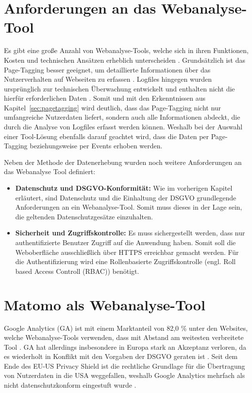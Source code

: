 \section{Anforderungen an das Webanalyse-Tool}
\label{sec:anforderungenWebanalyseTool}
Es gibt eine große Anzahl von Webanalyse-Tools, welche sich in ihren Funktionen, Kosten und technischen Ansätzen erheblich unterscheiden \parencite[S.244]{Rittgerberger2016}. Grundsätzlich ist das Page-Tagging besser geeignet, um detaillierte Informationen über das Nutzerverhalten auf Webseiten zu erfassen \parencite[Kap.2.5.3]{Hassler2019}. Logfiles hingegen wurden ursprünglich zur technischen Überwachung entwickelt und enthalten nicht die hierfür erforderlichen Daten \parencite[Kap.2.5.3]{Hassler2019}. Somit und mit den Erkenntnissen aus Kapitel~\ref{sec:pagetagging} wird deutlich, dass das Page-Tagging nicht nur umfangreiche Nutzerdaten liefert, sondern auch alle Informationen abdeckt, die durch die Analyse von Logfiles erfasst werden können. Weshalb bei der Auswahl einer Tool-Lösung ebenfalls darauf geachtet wird, dass die Daten per Page-Tagging beziehungsweise per Events erhoben werden.

Neben der Methode der Datenerhebung wurden noch weitere Anforderungen an das Webanalyse Tool definiert:

\begin{itemize}
    \item \textbf{Datenschutz und DSGVO-Konformität:} Wie im vorherigen Kapitel erläutert, sind Datenschutz und die Einhaltung der DSGVO grundlegende Anforderungen an ein Webanalyse-Tool. Somit muss dieses in der Lage sein, die geltenden Datenschutzgesätze einzuhalten.
    \item \textbf{Sicherheit und Zugriffskontrolle:} Es muss sichergestellt werden, dass nur authentifizierte Benutzer Zugriff auf die Anwendung haben. Somit soll die Weboberfläche ausschließlich über HTTPS erreichbar gemacht werden. Für die Authentifizierung wird eine Rollenbasierte Zugriffskontrolle (engl. Roll based Access Controll (RBAC)) benötigt.
\end{itemize}

\section{Matomo als Webanalyse-Tool}
Google Analytics (GA) ist mit einem Marktanteil von 82,0 \% unter den Websites, welche Webanalyse-Tools verwenden, dass mit Abstand am weitesten verbreitete Tool \parencite{W3Techs2025}. GA hat allerdings insbesondere in Europa stark an Akzeptanz verloren, da es wiederholt in Konflikt mit den Vorgaben der DSGVO geraten ist \parencite{Förster2024}. Seit dem Ende des EU-US Privacy Shield ist die rechtliche Grundlage für die Übertragung von Nutzerdaten in die USA weggefallen, weshalb Google Analytics mehrfach als nicht datenschutzkonform eingestuft wurde \parencite{Förster2024}.

